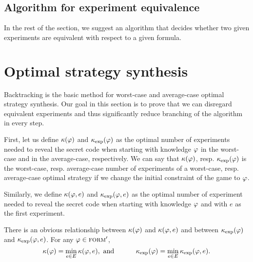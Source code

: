 \subsection{Algorithm for experiment equivalence}
In the rest of the section, we suggest an algorithm that decides
  whether two given experiments are equivalent with respect to a given formula.





\begin{example}
 \eqed
\end{example}

\section{Optimal strategy synthesis}

Backtracking is the basic method for worst-case and average-case
  optimal strategy synthesis.
Our goal in this section is to prove that we can disregard
  equivalent experiments and thus significantly
  reduce branching of the algorithm in every step.

\newcommand{\optval}{\kappa}
\newcommand{\optexp}{\varepsilon}
\newcommand{\optvale}{\kappa_\textrm{exp}}
\newcommand{\optexpe}{\varepsilon_\textrm{exp}}

First, let us define $\optval(\form)$ and $\optvale(\form)$ as
 the optimal number of experiments needed to reveal the secret code
  when starting with knowledge $\varphi$
  in the worst-case and in the average-case, respectively.
We can say that $\optval(\form)$, resp. $\optvale(\form)$ is
  the worst-case, resp. average-case number of experiments of
  a worst-case, resp. average-case optimal strategy
  if we change the initial constraint of the game to $\varphi$.

Similarly, we define $\optval(\form, e)$ and $\optvale(\form, e)$ as
  the optimal number of experiment needed to reveal the secret code
  when starting with knowledge $\varphi$ and
  with $e$ as the first experiment.

There is an obvious relationship between $\optval(\form)$ and $\optval(\form,e)$
  and between $\optvale(\form)$ and $\optvale(\form,e)$.
For any $\varphi\in{\textsc{form}'}$,
\begin{equation}
\optval(\form) = \min_{e\in\Exp}\optval(\form, e),\textrm{ and }
\hspace{1cm}
\optvale(\form) = \min_{e\in\Exp}\optvale(\form, e).
\label{opttriv}
\end{equation}

